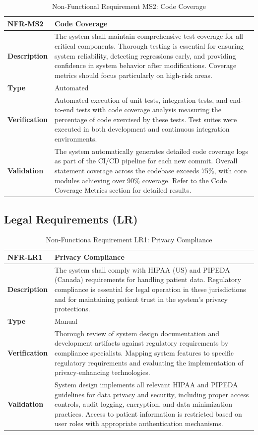 \documentclass[12pt, titlepage]{article}
\begin{document}
\begin{table}[H]
\centering
{}
\begin{tabular}{|p{3.5cm}|p{11.5cm}|}
\hline
\rowcolor{gray!30}
\textbf{NFR-MS2} & \textbf{Code Coverage} \\
\hline
\textbf{Description} & The system shall maintain comprehensive test coverage for all critical components. Thorough testing is essential for ensuring system reliability, detecting regressions early, and providing confidence in system behavior after modifications. Coverage metrics should focus particularly on high-risk areas. \\
\hline
\textbf{Type} & Automated \\
\hline
\textbf{Verification} & Automated execution of unit tests, integration tests, and end-to-end tests with code coverage analysis measuring the percentage of code exercised by these tests. Test suites were executed in both development and continuous integration environments. \\
\hline
\textbf{Validation} & The system automatically generates detailed code coverage logs as part of the CI/CD pipeline for each new commit. Overall statement coverage across the codebase exceeds 75\%, with core modules achieving over 90\% coverage. Refer to the Code Coverage Metrics section for detailed results. \\
\hline
\end{tabular}
\caption{Non-Functional Requirement MS2: Code Coverage}
\end{table}

\subsection{Legal Requirements (LR)}
\begin{table}[H]
\centering
{}
\begin{tabular}{|p{3.5cm}|p{11.5cm}|}
\hline
\rowcolor{gray!30}
\textbf{NFR-LR1} & \textbf{Privacy Compliance} \\
\hline
\textbf{Description} & The system shall comply with HIPAA (US) and PIPEDA (Canada) requirements for handling patient data. Regulatory compliance is essential for legal operation in these jurisdictions and for maintaining patient trust in the system's privacy protections. \\
\hline
\textbf{Type} & Manual \\
\hline
\textbf{Verification} & Thorough review of system design documentation and development artifacts against regulatory requirements by compliance specialists. Mapping system features to specific regulatory requirements and evaluating the implementation of privacy-enhancing technologies. \\
\hline
\textbf{Validation} & System design implements all relevant HIPAA and PIPEDA guidelines for data privacy and security, including proper access controls, audit logging, encryption, and data minimization practices. Access to patient information is restricted based on user roles with appropriate authentication mechanisms. \\
\hline
\end{tabular}
\caption{Non-Functiona Requirement LR1: Privacy Compliance}
\end{table}
\newpage
\end{document}
